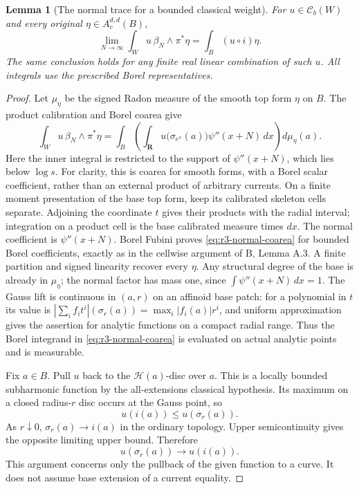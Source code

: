 \documentclass[11pt,a4paper]{article}
\numberwithin{equation}{section}
\newtheorem{lemma}[theorem]{Lemma}
\theoremstyle{definition}
\theoremstyle{remark}
\newcommand{\Cb}{\mathcal C_b}
\begin{document}
\begin{lemma}[The normal trace for a bounded classical weight]
\label{lem:r3-bounded-normal-trace}
For $u\in\Cb(W)$ and every original
$\eta\in A_c^{d,d}(B)$,
\begin{equation}
 \lim_{N\to\infty}\int_W u\,\beta_N\wedge\pi^*\eta
       =\int_B (u\circ i)\eta.
 \label{eq:r3-normal-trace}
\end{equation}
The same conclusion holds for any finite real linear combination
of such $u$. All integrals use the prescribed Borel representatives.
\end{lemma}

\begin{proof}
Let $\mu_\eta$ be the signed Radon measure of the smooth top
form $\eta$ on $B$. The product calibration and Borel coarea give
\begin{equation}
 \int_W u\,\beta_N\wedge\pi^*\eta
 =\int_B\left(\int_{\mathbf R}
      u\bigl(\sigma_{e^x}(a)\bigr)\psi''(x+N)\,dx\right)
      d\mu_\eta(a).
 \label{eq:r3-normal-coarea}
\end{equation}
Here the inner integral is restricted to the support of
$\psi''(x+N)$, which lies below $\log s$.
For clarity, this is coarea for smooth forms, with a Borel scalar
coefficient, rather than an external product of arbitrary currents.
On a finite moment presentation of the base top form, keep its
calibrated skeleton cells separate. Adjoining the coordinate $t$
gives their products with the radial interval; integration on a
product cell is the base calibrated measure times $dx$. The normal
coefficient is $\psi''(x+N)$. Borel Fubini proves
\eqref{eq:r3-normal-coarea} for bounded Borel coefficients, exactly
as in the cellwise argument of \textup{B}, Lemma A.3. A finite
partition and signed linearity recover every $\eta$. Any structural
degree of the base is already in $\mu_\eta$; the normal factor has
mass one, since $\int\psi''(x+N)\,dx=1$.
The Gauss lift is continuous in $(a,r)$ on an affinoid base patch:
for a polynomial in $t$ its value is
$|\sum_i f_it^i|(\sigma_r(a))=\max_i|f_i(a)|r^i$,
and uniform approximation gives the assertion for analytic
functions on a compact radial range. Thus the Borel integrand
in \eqref{eq:r3-normal-coarea} is evaluated on actual analytic
points and is measurable.

Fix $a\in B$. Pull $u$ back to the $\mathscr H(a)$-disc over
$a$. This is a locally bounded subharmonic function by the
all-extensions classical hypothesis. Its maximum on a closed
radius-$r$ disc occurs at the Gauss point, so
\[
 u(i(a))\leq u(\sigma_r(a)).
\]
As $r\downarrow0$, $\sigma_r(a)\to i(a)$ in the ordinary
topology. Upper semicontinuity gives the opposite limiting upper
bound. Therefore
\begin{equation}
 u(\sigma_r(a))\longrightarrow u(i(a)).
 \label{eq:r3-radial-actual-limit}
\end{equation}
This argument concerns only the pullback of the given function to
a curve. It does not assume base extension of a current equality.


\end{proof}
\end{document}
